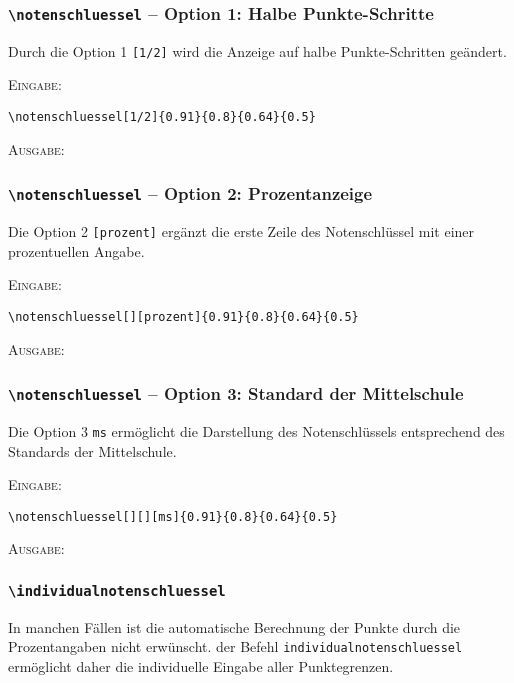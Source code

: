 \documentclass[a4paper,12pt]{article}
\begin{document}
\subsubsection*{\texttt{\textbackslash notenschluessel} -- Option 1: Halbe Punkte-Schritte}

Durch die Option 1 \texttt{[1/2]} wird die Anzeige auf halbe Punkte-Schritten geändert.

\textsc{Eingabe:}
\begin{verbatim}
\notenschluessel[1/2]{0.91}{0.8}{0.64}{0.5}
\end{verbatim}

\textsc{Ausgabe:}


\subsubsection*{\texttt{\textbackslash notenschluessel} -- Option 2: Prozentanzeige}

Die Option 2 \texttt{[prozent]} ergänzt die erste Zeile des Notenschlüssel mit einer prozentuellen Angabe.

\textsc{Eingabe:}
\begin{verbatim}
\notenschluessel[][prozent]{0.91}{0.8}{0.64}{0.5}
\end{verbatim}

\textsc{Ausgabe:}

\subsubsection*{\texttt{\textbackslash notenschluessel} -- Option 3: Standard der Mittelschule}

Die Option 3 \texttt{ms} ermöglicht die Darstellung des Notenschlüssels entsprechend des Standards der Mittelschule.

\textsc{Eingabe:}
\begin{verbatim}
\notenschluessel[][][ms]{0.91}{0.8}{0.64}{0.5}
\end{verbatim}

\textsc{Ausgabe:}


\subsubsection{\texttt{\textbackslash individualnotenschluessel}}
In manchen Fällen ist die automatische Berechnung der Punkte durch die Prozentangaben nicht erwünscht. der Befehl \texttt{individualnotenschluessel} ermöglicht daher die individuelle Eingabe aller Punktegrenzen.\\
\end{document}
